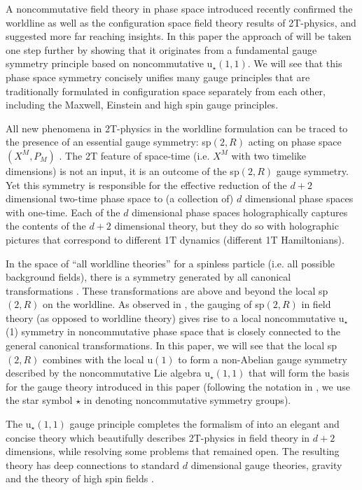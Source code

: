 \documentclass[a4paper,12pt]{article}
\begin{document}
A noncommutative field theory in phase space introduced recently \cite{NCSp}
confirmed the worldline as well as the configuration space field theory \cite
{field2T} results of 2T-physics, and suggested more far reaching insights.
In this paper the approach of \cite{NCSp} will be taken one step further by
showing that it originates from a fundamental gauge symmetry principle based
on noncommutative u$_{\star }\left( 1,1\right) .$ We will see that this
phase space symmetry concisely unifies many gauge principles that are
traditionally formulated in configuration space separately from each other,
including the Maxwell, Einstein and high spin gauge principles.

All new phenomena in 2T-physics in the worldline formulation can be traced
to the presence of an essential gauge symmetry: sp$\left( 2,R\right) $
acting on phase space $\left( X^{M},P_{M}\right) $ \cite{old2T}. The 2T
feature of space-time (i.e. $X^{M}$ with two timelike dimensions) is not an
input, it is an outcome of the sp$\left( 2,R\right) $ gauge symmetry. Yet
this symmetry is responsible for the effective reduction of the $d+2$
dimensional two-time phase space to (a collection of) $d$ dimensional phase
spaces with one-time. Each of the $d$ dimensional phase spaces
holographically captures the contents of the $d+2$ dimensional theory, but
they do so with holographic pictures that correspond to different 1T
dynamics (different 1T Hamiltonians).

In the space of ``all worldline theories'' for a spinless particle (i.e. all
possible background fields), there is a symmetry generated by all canonical
transformations \cite{highspin}. These transformations are above and beyond
the local sp$\left( 2,R\right) $ on the worldline. As observed in \cite{NCSp}%
, the gauging of sp$\left( 2,R\right) $ in field theory (as opposed to
worldline theory) gives rise to a local noncommutative u$_{\star }$(1)
symmetry in noncommutative phase space that is closely connected to the
general canonical transformations. In this paper, we will see that the local
sp$\left( 2,R\right) $ combines with the local u$\left( 1\right) $ to form a
non-Abelian gauge symmetry described by the noncommutative Lie algebra u$%
_{\star }\left( 1,1\right) $ that will form the basis for the gauge theory
introduced in this paper (following the notation in \cite{ncOn}, we use the
star symbol $\star $ in denoting noncommutative symmetry groups).

The u$_{\star }\left( 1,1\right) $ gauge principle completes the formalism
of \cite{NCSp} into an elegant and concise theory which beautifully
describes 2T-physics in field theory in $d+2$ dimensions, while resolving
some problems that remained open. The resulting theory has deep connections
to standard $d$ dimensional gauge theories, gravity and the theory of high
spin fields \cite{vasil}.
\end{document}
